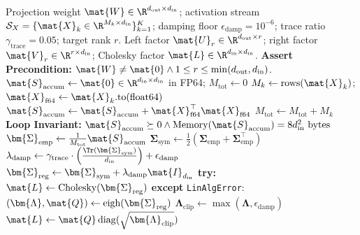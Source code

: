 \begin{algorithm}[H]
\caption[Streaming Activation Covariance Gathering and Cholesky Whitening]{Streaming Activation Covariance Gathering and Cholesky Whitening}
\label{alg:cholesky_whitening}
\begin{algorithmic}[1]
\REQUIRE Projection weight $\mat{W} \in \R^{d_{\text{out}} \times d_{\text{in}}}$; activation stream $\mathcal{S}_X = \{\mat{X}_k \in \R^{M_k \times d_{\text{in}}}\}_{k=1}^K$; damping floor $\epsilon_{\text{damp}} = 10^{-6}$; trace ratio $\gamma_{\text{trace}} = 0.05$; target rank $r$.
\ENSURE Left factor $\mat{U}_r \in \R^{d_{\text{out}} \times r}$; right factor $\mat{V}_r \in \R^{r \times d_{\text{in}}}$; Cholesky factor $\mat{L} \in \R^{d_{\text{in}} \times d_{\text{in}}}$.
\STATE \textbf{Assert Precondition:} $\mat{W} \ne \mat{0} \land 1 \le r \le \min(d_{\text{out}}, d_{\text{in}})$.
\STATE $\mat{S}_{\text{accum}} \leftarrow \mat{0} \in \R^{d_{\text{in}} \times d_{\text{in}}}$ in FP64; $M_{\text{tot}} \leftarrow 0$
    \STATE $M_k \leftarrow \text{rows}(\mat{X}_k)$; $\mat{X}_{\text{f64}} \leftarrow \mat{X}_k.\text{to}(\text{float64})$
    \STATE $\mat{S}_{\text{accum}} \leftarrow \mat{S}_{\text{accum}} + \mat{X}_{\text{f64}}^\top \mat{X}_{\text{f64}}$ 
    \STATE $M_{\text{tot}} \leftarrow M_{\text{tot}} + M_k$
    \STATE \textbf{Loop Invariant:} $\mat{S}_{\text{accum}} \succeq 0 \land \text{Memory}(\mat{S}_{\text{accum}}) = 8 d_{\text{in}}^2\text{ bytes}$
\ENDFOR
\STATE $\bm{\Sigma}_{\text{emp}} \leftarrow \frac{1}{M_{\text{tot}}} \mat{S}_{\text{accum}}$
\STATE $\bm{\Sigma}_{\text{sym}} \leftarrow \frac{1}{2}(\bm{\Sigma}_{\text{emp}} + \bm{\Sigma}_{\text{emp}}^\top)$
\STATE $\lambda_{\text{damp}} \leftarrow \gamma_{\text{trace}} \cdot \left(\frac{\Tr(\bm{\Sigma}_{\text{sym}})}{d_{\text{in}}}\right) + \epsilon_{\text{damp}}$
\STATE $\bm{\Sigma}_{\text{reg}} \leftarrow \bm{\Sigma}_{\text{sym}} + \lambda_{\text{damp}} \mat{I}_{d_{\text{in}}}$
\STATE \textbf{try:}
    \STATE \quad $\mat{L} \leftarrow \text{Cholesky}(\bm{\Sigma}_{\text{reg}})$ 
\STATE \textbf{except} \texttt{LinAlgError}:
    \STATE \quad $(\bm{\Lambda}, \mat{Q}) \leftarrow \text{eigh}(\bm{\Sigma}_{\text{reg}})$ 
    \STATE \quad $\bm{\Lambda}_{\text{clip}} \leftarrow \max(\bm{\Lambda}, \epsilon_{\text{damp}})$
    \STATE \quad $\mat{L} \leftarrow \mat{Q} \operatorname{diag}(\sqrt{\bm{\Lambda}_{\text{clip}}})$

\end{algorithmic}
\end{algorithm}
